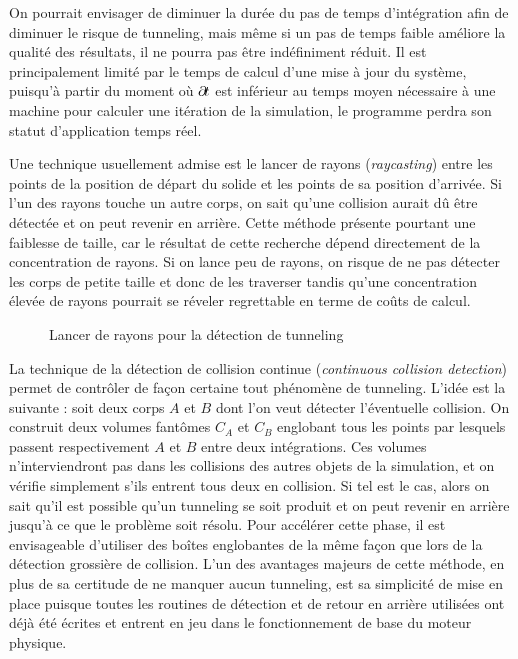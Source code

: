 On pourrait envisager de diminuer la durée du pas de temps
d'intégration afin de diminuer le risque de tunneling, mais même si un
pas de temps faible améliore la qualité des résultats, il ne pourra
pas être indéfiniment réduit. Il est principalement limité par le
temps de calcul d'une mise à jour du système, puisqu'à partir du
moment o\`u $\partial \! t$ est inférieur au temps moyen nécessaire à une
machine pour calculer une itération de la simulation, le programme
perdra son statut d'application temps réel.

Une technique usuellement admise est le lancer de rayons
(\textit{raycasting}) entre les points de la position de départ du
solide et les points de sa position d'arrivée. Si l'un des rayons
touche un autre corps, on sait qu'une collision aurait dû être
détectée et on peut revenir en arrière. Cette méthode présente
pourtant une faiblesse de taille, car le résultat de cette recherche
dépend directement de la concentration de rayons. Si on lance peu de
rayons, on risque de ne pas détecter les corps de petite taille et
donc de les traverser tandis qu'une concentration élevée de rayons
pourrait se réveler regrettable en terme de coûts de calcul.

\begin{figure}
  \centering
  
  \caption{Lancer de rayons pour la détection de tunneling}
  \label{tunneling2}
\end{figure}

La technique de la détection de collision continue (\textit{continuous
  collision detection}) permet de contrôler de façon certaine tout
phénomène de tunneling. L'idée est la suivante : soit deux corps $A$
et $B$ dont l'on veut détecter l'éventuelle collision. On construit
deux volumes fantômes $C_A$ et $C_B$ englobant tous les points par
lesquels passent respectivement $A$ et $B$ entre deux
intégrations. Ces volumes n'interviendront pas dans les collisions des
autres objets de la simulation, et on vérifie simplement s'ils entrent
tous deux en collision. Si tel est le cas, alors on sait qu'il est
possible qu'un tunneling se soit produit et on peut revenir en arrière
jusqu'à ce que le problème soit résolu. Pour accélérer cette phase, il
est envisageable d'utiliser des boîtes englobantes de la même façon
que lors de la détection grossière de collision. L'un des avantages
majeurs de cette méthode, en plus de sa certitude de ne manquer aucun
tunneling, est sa simplicité de mise en place puisque toutes les
routines de détection et de retour en arrière utilisées ont déjà été
écrites et entrent en jeu dans le fonctionnement de base du moteur
physique.

